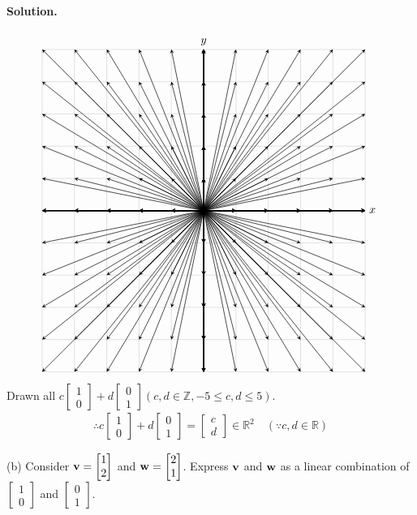 \paragraph{Solution.}
\begin{align*}
    \begin{tikzpicture}
        \draw[thin,gray!40] (-5,-5) grid (5,5);
        \draw[->] (-5,0)--(5,0) node[right]{$x$};
        \draw[->] (0,-5)--(0,5) node[above]{$y$};
        \foreach \x in {0, ..., 5} {
            \foreach \y in {0, ..., 5} {
                \draw[line width=0.5pt,black,-stealth](0,0)--(\x, \y);
                \draw[line width=0.5pt,black,-stealth](0,0)--(\x, 0);
                \draw[line width=0.5pt,black,-stealth](0,0)--(0, \y);
                \draw[line width=0.5pt,black,-stealth](0,0)--(\x, -\y);
                \draw[line width=0.5pt,black,-stealth](0,0)--(-\x, 0);
                \draw[line width=0.5pt,black,-stealth](0,0)--(-\x, \y);
                \draw[line width=0.5pt,black,-stealth](0,0)--(-\x, -\y);
                \draw[line width=0.5pt,black,-stealth](0,0)--(0, -\y);
            }
        }
    \end{tikzpicture}
\end{align*}
Drawn all $c\begin{bmatrix}
    1\\0
\end{bmatrix}+d\begin{bmatrix}
    0\\1
\end{bmatrix} (c, d \in \mathbb{Z}, -5 \leq c, d\leq 5)$.
\begin{align*}
    \therefore c\begin{bmatrix}
        1\\0
    \end{bmatrix}+d\begin{bmatrix}
        0\\1
    \end{bmatrix} = \begin{bmatrix}
        c\\d
    \end{bmatrix} \in \mathbb{R}^2\quad(\because c, d \in \mathbb{R})
\end{align*}

(b) Consider $\vb{v} = \begin{bmatrix}
    1\\2
\end{bmatrix}$ and $\vb{w} = \begin{bmatrix}
    2\\1
\end{bmatrix}$. Express $\vb{v}$ and $\vb{w}$ as a linear combination of $\begin{bmatrix}
    1\\0
\end{bmatrix}$ and $\begin{bmatrix}
    0\\1
\end{bmatrix}$.
